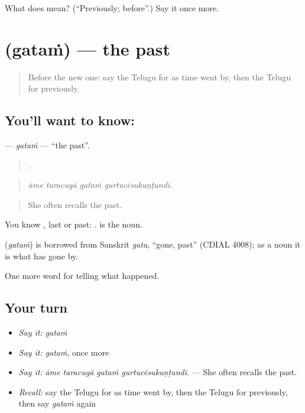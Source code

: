 \begin{tcolorbox}[breakable,colback=teal!4,colframe=teal!35!black,title={Before you move on}]
What does  mean? (\textquotedblleft{}Previously; before\textquotedblright{}.) Say it once more.
\end{tcolorbox}
\section[\texorpdfstring{\te{గతం} (gataṁ)}{గతం (gataṁ)}]{ (gataṁ) — the past}

\label{lesson:TE-C338-gatam}



\begin{quote}
Before the new one: say the Telugu for as time went by, then the Telugu for previously.
\end{quote}

\subsection*{You'll want to know: }
\textbf{} — \emph{gataṁ} — \textquotedblleft{}the past\textquotedblright{}.

\begin{quote}
   .
\end{quote}

\begin{quote}
\emph{āme taracugā gataṁ gurtucēsukuṇṭundi.}
\end{quote}

\begin{quote}
She often recalls the past.
\end{quote}

You know , last or past:  .  is the noun.

\begin{cousinweb}
\textbf{} (\emph{gataṁ}) is borrowed from Sanskrit \emph{gata}, \textquotedblleft{}gone, past\textquotedblright{} (CDIAL 4008); as a noun it is what has gone by.
\end{cousinweb}

\begin{grammarlens}[title={What you've built}]
One more word for telling what happened.
\end{grammarlens}

\subsection*{Your turn}
\begin{itemize}
\raggedright
  \item \emph{Say it:} \emph{gataṁ}
  \item \emph{Say it:} \emph{gataṁ}, once more
  \item \emph{Say it:} \emph{āme taracugā gataṁ gurtucēsukuṇṭundi.} — She often recalls the past.
  \item \emph{Recall:} say the Telugu for as time went by, then the Telugu for previously, then say \emph{gataṁ} again
\end{itemize}

